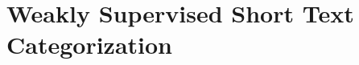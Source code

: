 \chapter{Weakly Supervised Short Text Categorization} \label{cha:weakly_supervised_short_text_cat}






